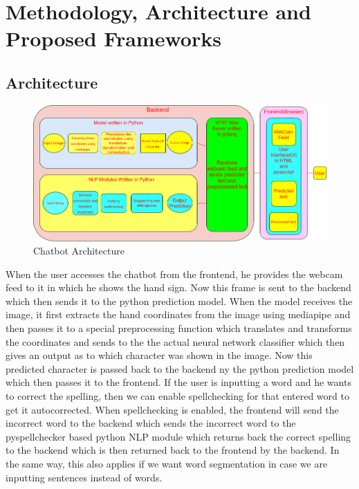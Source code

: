 \documentclass[12pt,a4paper]{report}
\begin{document}
\section{Methodology, Architecture and Proposed Frameworks}

\subsection{Architecture}
\begin{figure}[htbp]
	\centerline{\includegraphics[scale=0.4]{architecture.png}}
	\caption{Chatbot Architecture}
	\label{Architecture}
\end{figure}
When the user accesses the chatbot from the frontend, he provides the webcam feed to it in which he shows the hand sign. Now this frame is sent to the backend which then sends it to the python prediction model. When the model receives the image, it first extracts the hand coordinates from the image using mediapipe and then passes it to a special preprocessing function which translates and transforms the coordinates and sends to the the actual neural network classifier which then gives an output as to which character was shown in the image. Now this predicted character is passed back to the backend ny the python prediction model which then passes it to the frontend. If the user is inputting a word and he wants to correct the spelling, then we can enable spellchecking for that entered word to get it autocorrected. When spellchecking is enabled, the frontend will send the incorrect word to the backend which sends the incorrect word to the pyspellchecker based python NLP module which returns back the correct spelling to the backend which is then returned back to the frontend by the backend. In the same way, this also applies if we want word segmentation in case we are inputting sentences instead of words.
\end{document}
